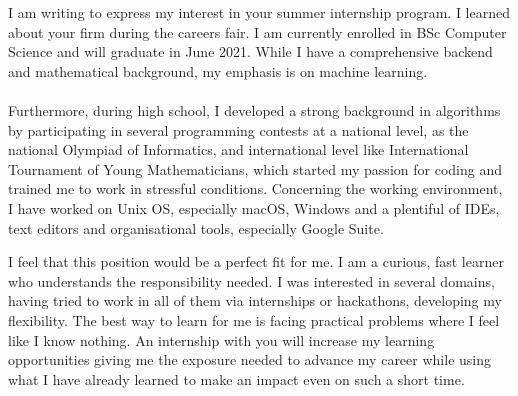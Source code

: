 \documentclass[12pt, a4paper]{awesome-cv}
\begin{document}
\makecvheader

\makelettertitle

\begin{cvletter}
I am writing to express my interest in your summer internship program. I learned about your firm during the careers fair.
I am currently enrolled in BSc Computer Science and will graduate in June 2021. While I have a comprehensive backend and mathematical background, my emphasis is on machine learning. \\ \\
Furthermore, during high school, I developed a strong background in algorithms by participating in several programming contests at a national level, as the national Olympiad of Informatics, and international level like International Tournament of Young Mathematicians, which started my passion for coding and trained me to work in stressful conditions. Concerning the working environment, I have worked on Unix OS, especially macOS, Windows and a plentiful of IDEs, text editors and organisational tools, especially Google Suite.


I feel that this position would be a perfect fit for me. I am a curious, fast learner who understands the responsibility needed. I was interested in several domains, having tried to work in all of them via internships or hackathons, developing my flexibility. The best way to learn for me is facing practical problems where I feel like I know nothing. An internship with you will increase my learning opportunities giving me the exposure needed to advance my career while using what I have already learned to make an impact even on such a short time.



\end{cvletter}
\end{document}
